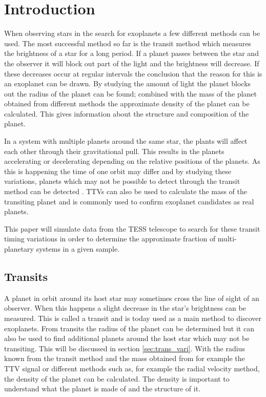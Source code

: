 \documentclass[12pt]{report}
\begin{document}
\newpage

\setcounter{page}{1} %

\tableofcontents

\newpage

\listoffigures 
\listoftables

\newpage

\chapter{Introduction}
When observing stars in the search for exoplanets a few different methods can be used. The most successful method so far is the transit method which measures the brightness of a star for a long period. If a planet passes between the star and the observer it will block out part of the light and the brightness will decrease. If these decreases occur at regular intervals the conclusion that the reason for this is an exoplanet can be drawn. By studying the amount of light the planet blocks out the radius of the planet can be found; combined with the mass of the planet obtained from different methods the approximate density of the planet can be calculated. This gives information about the structure and composition of the planet.

In a system with multiple planets around the same star, the plants will affect each other through their gravitational pull. This results in the planets accelerating or decelerating depending on the relative positions of the planets. As this is happening the time of one orbit may differ and by studying these variations, planets which may not be possible to detect through the transit method can be detected \citep{2012Sci...336.1133N}. TTVs can also be used to calculate the mass of the transiting planet and is commonly used to confirm exoplanet candidates as real planets.

This paper will simulate data from the TESS telescope to search for these transit timing variations in order to determine the approximate fraction of multi-planetary systems in a given sample.

\section{Transits}
	A planet in orbit around its host star may sometimes cross the line of sight of an observer. When this happens a slight decrease in the star's brightness can be measured. This is called a transit and is today used as a main method to discover exoplanets. From transits the radius of the planet can be determined but it can also be used to find additional planets around the host star which may not be transiting. This will be discussed in section \ref{sec:trans_vari}. With the radius known from the transit method and the mass obtained from for example the TTV signal or different methods such as, for example the radial velocity method, the density of the planet can be calculated. The density is important to understand what the planet is made of and the structure of it.
\end{document}
